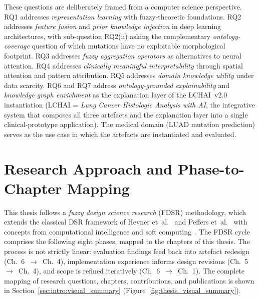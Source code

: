 These questions are deliberately framed from a computer science perspective.
RQ1 addresses \emph{representation learning} with fuzzy-theoretic foundations.
RQ2 addresses \emph{feature fusion} and \emph{prior knowledge
injection} in deep learning architectures, with sub-question RQ2(ii)
asking the complementary \emph{ontology-coverage} question of which
mutations have no exploitable morphological footprint.
RQ3 addresses \emph{fuzzy aggregation operators} as alternatives to neural
attention.
RQ4 addresses \emph{clinically meaningful interpretability} through spatial
attention and pattern attribution.
RQ5 addresses \emph{domain knowledge utility} under data scarcity.
RQ6 and RQ7 address \emph{ontology-grounded explainability} and
\emph{knowledge graph enrichment} as the explanation layer of the
LCHAI~v2.0 instantiation (LCHAI = \emph{Lung Cancer Histologic
Analysis with AI}, the integrative system that composes all
three artefacts and the explanation layer into a single
clinical-prototype application).
The medical domain (LUAD mutation prediction) serves as the use case in which
the artefacts are instantiated and evaluated.
\section{Research Approach and Phase-to-Chapter Mapping}
\label{sec:intro:method}

This thesis follows a \emph{fuzzy design science research} (FDSR) methodology, which extends the classical DSR framework of Hevner et~al.~\cite{hevner2004design} and Peffers et~al.~\cite{peffers2007dsrm} with concepts from computational intelligence and soft computing~\cite{meier2009fuzzy}.  The FDSR cycle comprises the following eight phases, mapped to the chapters of this thesis.
The process is not strictly linear: evaluation findings feed back into artefact redesign (Ch.~6~$\to$~Ch.~4), implementation experience informs design revisions (Ch.~5~$\to$~Ch.~4), and scope is refined iteratively (Ch.~6~$\to$~Ch.~1).
The complete mapping of research questions, chapters, contributions, and publications is shown in Section~\ref{sec:intro:visual_summary} (Figure~\ref{fig:thesis_visual_summary}).

